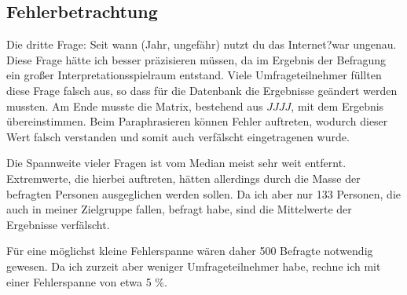 \subsection{Fehlerbetrachtung}

Die dritte Frage: \glqq Seit wann (Jahr, ungefähr) nutzt du das Internet?\grqq \nobreakspace war ungenau. Diese Frage hätte ich besser präzisieren müssen, da im Ergebnis der Befragung ein großer Interpretationsspielraum entstand. Viele Umfrageteilnehmer füllten diese Frage falsch aus, so dass für die Datenbank die Ergebnisse geändert werden mussten. Am Ende musste die Matrix, bestehend aus $JJJJ$, mit dem Ergebnis übereinstimmen. Beim Paraphrasieren können Fehler
auftreten, wodurch dieser Wert falsch verstanden und somit auch verfälscht eingetragenen wurde.

Die Spannweite vieler Fragen ist vom Median meist sehr weit entfernt. Extremwerte, die hierbei auftreten, hätten allerdings durch die Masse der befragten Personen ausgeglichen werden sollen. Da ich aber nur 133 Personen, die auch in meiner Zielgruppe fallen, befragt habe, sind die Mittelwerte der Ergebnisse verfälscht.

Für eine möglichst kleine Fehlerspanne wären daher 500 Befragte\cite{aussagekraft} notwendig gewesen. Da ich zurzeit aber weniger Umfrageteilnehmer habe, rechne ich mit einer Fehlerspanne von etwa 5 \%.